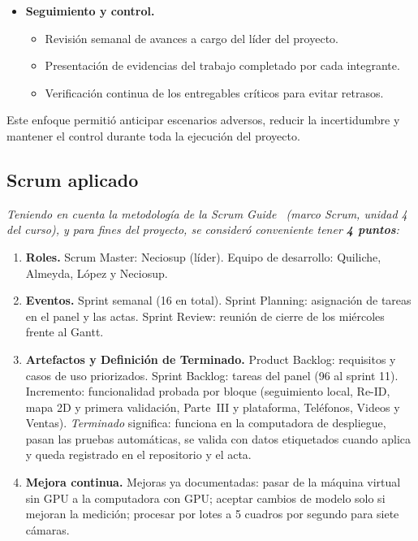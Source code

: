 \documentclass[12pt,a4paper]{article}
\begin{document}
\begin{itemize}
    \item \textbf{Seguimiento y control.}
    \begin{itemize}
        \item Revisión semanal de avances a cargo del líder del proyecto.
        \item Presentación de evidencias del trabajo completado por cada
        integrante.
        \item Verificación continua de los entregables críticos para
        evitar retrasos.
    \end{itemize}
\end{itemize}

Este enfoque permitió anticipar escenarios adversos, reducir la
incertidumbre y mantener el control durante toda la ejecución del
proyecto.

\subsection{Scrum aplicado}
\label{sec:scrum}

\textit{Teniendo en cuenta la metodología de la Scrum Guide~\cite{scrumguide}
(marco Scrum, unidad 4 del curso), y para fines del proyecto, se consideró
conveniente tener \textbf{4 puntos}:}

\begin{enumerate}
    \item \textbf{Roles.} Scrum Master:
    Neciosup (líder). Equipo de desarrollo: Quiliche,
    Almeyda, López y Neciosup.

    \item \textbf{Eventos.} Sprint semanal (16 en total). Sprint Planning:
    asignación de tareas en el panel y las actas. Sprint Review: reunión de cierre de los miércoles
    frente al Gantt.

    \item \textbf{Artefactos y Definición de Terminado.} Product Backlog:
    requisitos y casos de uso priorizados. Sprint Backlog: tareas del panel
    (96 al sprint 11). Incremento: funcionalidad probada por bloque
    (seguimiento local, Re-ID, mapa 2D y primera validación, Parte~III y
    plataforma, Teléfonos, Videos y Ventas).
    \textit{Terminado} significa:
    funciona en la computadora de despliegue, pasan las pruebas automáticas, se
    valida con datos etiquetados cuando aplica y queda registrado en el
    repositorio y el acta.

    \item \textbf{Mejora continua.} Mejoras ya documentadas: pasar de la
    máquina virtual sin GPU a la computadora con GPU; aceptar cambios de modelo
    solo si mejoran la medición; procesar por lotes a 5 cuadros por segundo
    para siete cámaras.
\end{enumerate}
\end{document}
